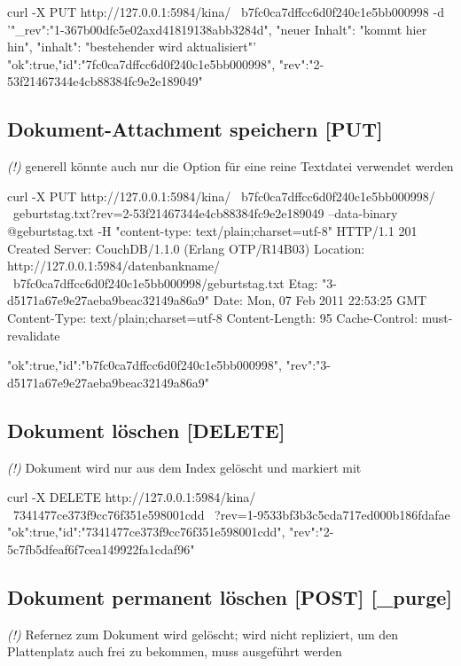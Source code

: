 \documentclass[19pt,landscape,twocolumn]{article}
\newcommand{\mono}[1]{\texttt{\textendash\textendash {#1}}}
\newcommand{\htmlverb}[1]{{[}\textbf{{#1}}{]}}
\begin{document}
\begin{code}
curl -X PUT http://127.0.0.1:5984/kina/ \
  b7fc0ca7dffcc6d0f240c1e5bb000998
     -d '{"_rev":"1-367b00dfc5e02axd41819138abb3284d",
          "neuer Inhalt": "kommt hier hin",
          "inhalt": "bestehender wird aktualisiert"}'
{"ok":true,"id":"7fc0ca7dffcc6d0f240c1e5bb000998",
 "rev":"2-53f21467344e4cb88384fc9e2e189049"}
\end{code}

\subsection{Dokument-Attachment speichern \htmlverb{PUT}}
\emph{(!)} generell könnte auch nur die Option \mono{data} für eine reine Textdatei verwendet werden

\begin{code}
curl -X PUT http://127.0.0.1:5984/kina/ \
  b7fc0ca7dffcc6d0f240c1e5bb000998/ \
  geburtstag.txt?rev=2-53f21467344e4cb88384fc9e2e189049
     --data-binary @geburtstag.txt
     -H "content-type: text/plain;charset=utf-8"
HTTP/1.1 201 Created
Server: CouchDB/1.1.0 (Erlang OTP/R14B03)
Location: http://127.0.0.1:5984/datenbankname/ \
  b7fc0ca7dffcc6d0f240c1e5bb000998/geburtstag.txt
Etag: "3-d5171a67e9e27aeba9beac32149a86a9"
Date: Mon, 07 Feb 2011 22:53:25 GMT
Content-Type: text/plain;charset=utf-8
Content-Length: 95
Cache-Control: must-revalidate

{"ok":true,"id":"b7fc0ca7dffcc6d0f240c1e5bb000998",
 "rev":"3-d5171a67e9e27aeba9beac32149a86a9"}
\end{code}

\subsection{Dokument löschen \htmlverb{DELETE}}
\emph{(!)} Dokument wird nur aus dem Index gelöscht und markiert mit \mono{deleted:true}

\begin{code}
curl -X DELETE http://127.0.0.1:5984/kina/ \
  7341477ce373f9cc76f351e598001cdd \
  ?rev=1-9533bf3b3c5cda717ed000b186fdafae
{"ok":true,"id":"7341477ce373f9cc76f351e598001cdd",
 "rev":"2-5c7fb5dfeaf6f7cea149922fa1cdaf96"}
\end{code}

\subsection{Dokument permanent löschen \htmlverb{POST} \htmlverb{\_purge}}
\emph{(!)} Refernez zum Dokument wird gelöscht; wird nicht repliziert, um den
Plattenplatz auch frei zu bekommen, muss \mono{\_compact} ausgeführt werden
\end{document}
